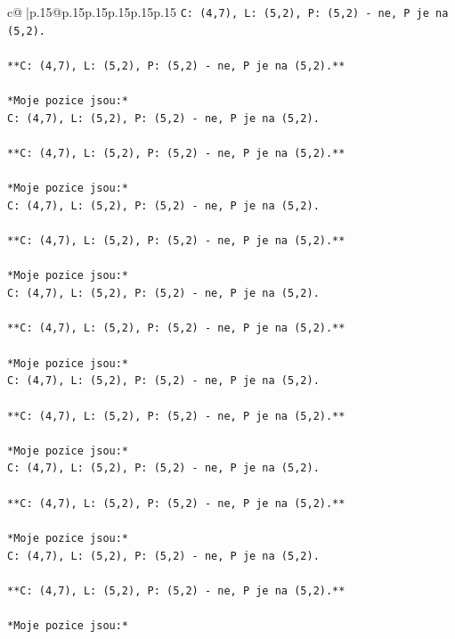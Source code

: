 \documentclass{article}
\begin{document}
{\begin{supertabular}{c@{$\;$}|p{.15\linewidth}@{}p{.15\linewidth}p{.15\linewidth}p{.15\linewidth}p{.15\linewidth}p{.15\linewidth}}
{{{\texttt{C: (4,7), L: (5,2), P: (5,2) {-} ne, P je na (5,2).} \\
\\ 
\texttt{**C: (4,7), L: (5,2), P: (5,2) {-} ne, P je na (5,2).**} \\
\\ 
\texttt{*Moje pozice jsou:*} \\
\texttt{C: (4,7), L: (5,2), P: (5,2) {-} ne, P je na (5,2).} \\
\\ 
\texttt{**C: (4,7), L: (5,2), P: (5,2) {-} ne, P je na (5,2).**} \\
\\ 
\texttt{*Moje pozice jsou:*} \\
\texttt{C: (4,7), L: (5,2), P: (5,2) {-} ne, P je na (5,2).} \\
\\ 
\texttt{**C: (4,7), L: (5,2), P: (5,2) {-} ne, P je na (5,2).**} \\
\\ 
\texttt{*Moje pozice jsou:*} \\
\texttt{C: (4,7), L: (5,2), P: (5,2) {-} ne, P je na (5,2).} \\
\\ 
\texttt{**C: (4,7), L: (5,2), P: (5,2) {-} ne, P je na (5,2).**} \\
\\ 
\texttt{*Moje pozice jsou:*} \\
\texttt{C: (4,7), L: (5,2), P: (5,2) {-} ne, P je na (5,2).} \\
\\ 
\texttt{**C: (4,7), L: (5,2), P: (5,2) {-} ne, P je na (5,2).**} \\
\\ 
\texttt{*Moje pozice jsou:*} \\
\texttt{C: (4,7), L: (5,2), P: (5,2) {-} ne, P je na (5,2).} \\
\\ 
\texttt{**C: (4,7), L: (5,2), P: (5,2) {-} ne, P je na (5,2).**} \\
\\ 
\texttt{*Moje pozice jsou:*} \\
\texttt{C: (4,7), L: (5,2), P: (5,2) {-} ne, P je na (5,2).} \\
\\ 
\texttt{**C: (4,7), L: (5,2), P: (5,2) {-} ne, P je na (5,2).**} \\
\\ 
\texttt{*Moje pozice jsou:*} \\
}}}
\end{supertabular}}
\end{document}

